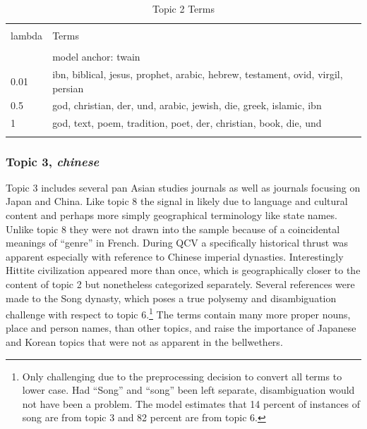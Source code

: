\documentclass[]{book}
\let\rmarkdownfootnote\footnote%
\def\footnote{\protect\rmarkdownfootnote}
\theoremstyle{definition}
\theoremstyle{definition}
\theoremstyle{definition}
\theoremstyle{remark}
\begin{document}
\begin{table}[!htbp] \centering 
  \caption{Topic 2 Terms} 
  \label{tab:t2d} 
\begin{tabularx}{\textwidth}{@{\extracolsep{5pt}} lY} 
\\[-1.8ex]\hline 
\hline \\[-1.8ex] 
lambda & Terms \\ 
\hline \\[-1.8ex] 
 & model anchor: twain \\ 
0.01 & ibn, biblical, jesus, prophet, arabic, hebrew, testament, ovid, virgil, persian \\ 
0.5 & god, christian, der, und, arabic, jewish, die, greek, islamic, ibn \\ 
1 & god, text, poem, tradition, poet, der, christian, book, die, und \\ 
\hline \\[-1.8ex] 
\end{tabularx} 
\end{table}

\hypertarget{topic-3-chinese}{%
\subsubsection{\texorpdfstring{Topic 3,
\emph{chinese}}{Topic 3, chinese}}\label{topic-3-chinese}}

Topic 3 includes several pan Asian studies journals as well as journals
focusing on Japan and China. Like topic 8 the signal in likely due to
language and cultural content and perhaps more simply geographical
terminology like state names. Unlike topic 8 they were not drawn into
the sample because of a coincidental meanings of ``genre'' in French.
During QCV a specifically historical thrust was apparent especially with
reference to Chinese imperial dynasties. Interestingly Hittite
civilization appeared more than once, which is geographically closer to
the content of topic 2 but nonetheless categorized separately. Several
references were made to the Song dynasty, which poses a true polysemy
and disambiguation challenge with respect to topic 6.\footnote{Only
  challenging due to the preprocessing decision to convert all terms to
  lower case. Had ``Song'' and ``song'' been left separate,
  disambiguation would not have been a problem. The model estimates that
  14 percent of instances of song are from topic 3 and 82 percent are
  from topic 6.} The terms contain many more proper nouns, place and
person names, than other topics, and raise the importance of Japanese
and Korean topics that were not as apparent in the bellwethers.
\end{document}
